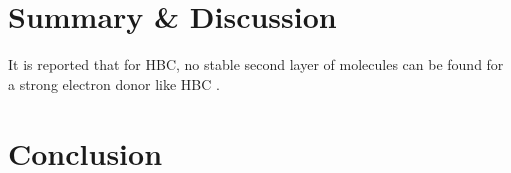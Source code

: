 \section{Summary \& Discussion}
It is reported that for HBC, no stable second layer of molecules can be found for a strong electron donor like HBC \cite{de_feyter_two-dimensional_2003}.

\section{Conclusion}